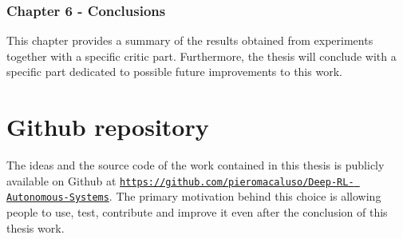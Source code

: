 \subsubsection*{Chapter 6 - Conclusions} 

This chapter provides a summary of the results obtained from experiments together with a specific critic part.
Furthermore, the thesis will conclude with a specific part dedicated to possible future improvements to this work.

\section{Github repository}

The ideas and the source code of the work contained in this thesis is publicly available on Github at \href{https://github.com/pieromacaluso/Deep-RL-Autonomous-Systems}{\texttt{https://github.com/pieromacaluso/Deep-RL- Autonomous-Systems}}. The primary motivation behind this choice is allowing people to use, test, contribute and improve it even after the conclusion of this thesis work.
